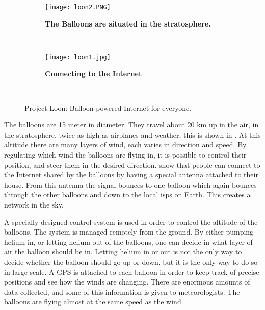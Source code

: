 \begin{figure}
        \centering
        \begin{subfigure}[t]{0.43\textwidth}
                \texttt{[image: loon2.PNG]}
                \caption[The Balloons are situated in the stratosphere]{\textbf{The Balloons are situated in the stratosphere.}} 
                \label{fig:loonStratosphere}
        \end{subfigure}%
        ~ %
        \begin{subfigure}[t]{0.415\textwidth}
                \texttt{[image: loon1.jpg]}
               \caption[Connecting to the Internet]							{\textbf{Connecting to the Internet}} 
                \label{fig:loonConnect}
        \end{subfigure}
        ~ %
        \caption{Project Loon: Balloon-powered Internet for everyone.}\label{fig:loon}
\end{figure}



The balloons are 15 meter in diameter. They travel about 20 km up in the air, in the stratosphere, twice as high as airplanes and weather, this is shown in . At this altitude there are many layers of wind, each varies in direction and speed. By regulating which wind the balloons are flying in, it is possible to control their position, and steer them in the desired direction.  show that people can connect to the Internet shared by the balloons by having a special antenna attached to their house. From this antenna the signal bounces to one balloon which again bounces through the other balloons and down to the local \glspl{isp} on Earth. This creates a network in the sky. 

A specially designed control system is used in order to control the altitude of the balloons. The system is managed remotely from the ground. By either pumping helium in, or letting helium out of the balloons, one can decide in what layer of air the balloon should be in. Letting helium in or out is not the only way to decide whether the balloon should go up or down, but it is the only way to do so in large scale. A GPS is attached to each balloon in order to keep track of precise positions and see how the winds are changing. There are enormous amounts of data collected, and some of this information is given to meteorologists. The balloons are flying almost at the same speed as the wind.  

